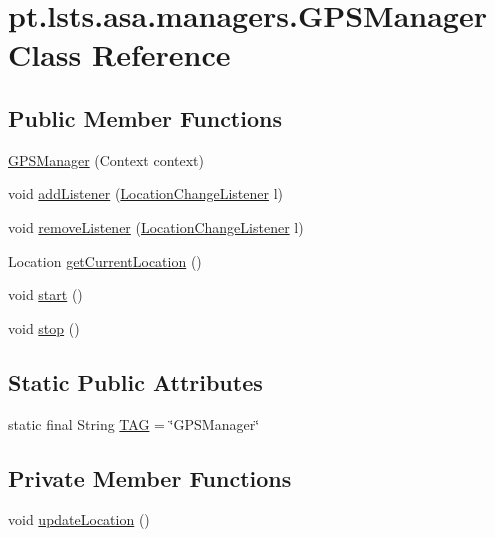\hypertarget{classpt_1_1lsts_1_1asa_1_1managers_1_1GPSManager}{}\section{pt.\+lsts.\+asa.\+managers.\+G\+P\+S\+Manager Class Reference}
\label{classpt_1_1lsts_1_1asa_1_1managers_1_1GPSManager}
\subsection*{Public Member Functions}
\begin{DoxyCompactItemize}
\item 
\hyperlink{classpt_1_1lsts_1_1asa_1_1managers_1_1GPSManager_a57d38e41bae7793807103f97c8b1e0b7}{G\+P\+S\+Manager} (Context context)
\item 
void \hyperlink{classpt_1_1lsts_1_1asa_1_1managers_1_1GPSManager_aa81bbc2318b1c27bc20b4a3de3e4f5a5}{add\+Listener} (\hyperlink{interfacept_1_1lsts_1_1asa_1_1listenners_1_1LocationChangeListener}{Location\+Change\+Listener} l)
\item 
void \hyperlink{classpt_1_1lsts_1_1asa_1_1managers_1_1GPSManager_a3e8544b05970e32a8906ed6f84baf14c}{remove\+Listener} (\hyperlink{interfacept_1_1lsts_1_1asa_1_1listenners_1_1LocationChangeListener}{Location\+Change\+Listener} l)
\item 
Location \hyperlink{classpt_1_1lsts_1_1asa_1_1managers_1_1GPSManager_aa1ca6cad2daeb23e596f075a344249fa}{get\+Current\+Location} ()
\item 
void \hyperlink{classpt_1_1lsts_1_1asa_1_1managers_1_1GPSManager_a648bac49b2828cd36ffd89505b340a46}{start} ()
\item 
void \hyperlink{classpt_1_1lsts_1_1asa_1_1managers_1_1GPSManager_a71f7b97e412a8f3faa21e5d15e1d60c3}{stop} ()
\end{DoxyCompactItemize}
\subsection*{Static Public Attributes}
\begin{DoxyCompactItemize}
\item 
static final String \hyperlink{classpt_1_1lsts_1_1asa_1_1managers_1_1GPSManager_a87bf0b045ff632c19f847ac728d0001d}{T\+A\+G} = \char`\"{}G\+P\+S\+Manager\char`\"{}
\end{DoxyCompactItemize}
\subsection*{Private Member Functions}
\begin{DoxyCompactItemize}
\item 
void \hyperlink{classpt_1_1lsts_1_1asa_1_1managers_1_1GPSManager_a9d88c4565df05512b24607c497dbff5f}{update\+Location} ()
\end{DoxyCompactItemize}
